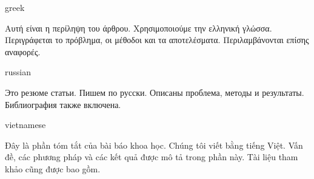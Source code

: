 \documentclass[balance,upint,subscriptcorrection,varvw,mathalfa=cal=boondoxo,spanish,french,vietnamese,russian,greek,pdf-a,colorlinks]{asmeconf}
\begin{document}
\ifpdftex
    \begin{selectlanguage}{greek}%
    \begin{abstract*}
    Αυτή είναι η περίληψη του άρθρου. Χρησιμοποιούμε την ελληνική γλώσσα. Περιγράφεται το πρόβλημα, οι μέθοδοι και τα αποτελέσματα. Περιλαμβάνονται επίσης αναφορές.
    \end{abstract*}
    \end{selectlanguage}%
    
    \begin{selectlanguage}{russian}
    \begin{abstract*}
    Это резюме статьи. Пишем по русски. Описаны проблема, методы и результаты. Библиография также включена.%
    \end{abstract*}
    \end{selectlanguage}%
    
    \begin{selectlanguage}{vietnamese}
    \begin{abstract*}
    Đây là phần tóm tắt của bài báo khoa học. Chúng tôi viết bằng tiếng Việt. Vấn đề, các phương pháp và các kết quả được mô tả trong phần này. Tài liệu tham khảo cũng được bao gồm.
    \end{abstract*}
    \end{selectlanguage}%
\fi
   
\end{document}
